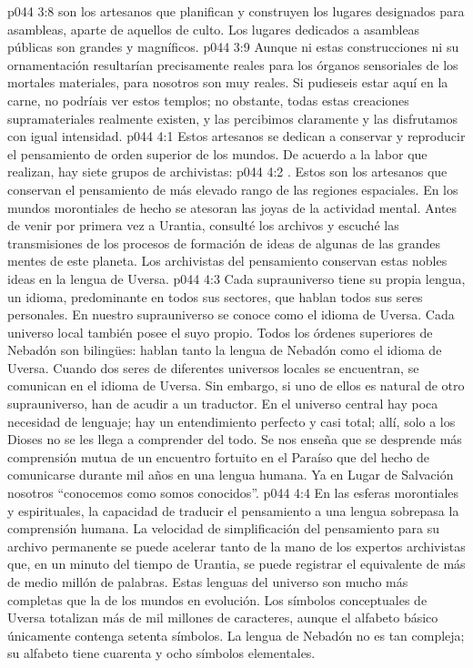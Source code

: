 \vs p044 3:8  son los artesanos que planifican y construyen los lugares designados para asambleas, aparte de aquellos de culto. Los lugares dedicados a asambleas públicas son grandes y magníficos.
\vs p044 3:9 Aunque ni estas construcciones ni su ornamentación resultarían precisamente reales para los órganos sensoriales de los mortales materiales, para nosotros son muy reales. Si pudieseis estar aquí en la carne, no podríais ver estos templos; no obstante, todas estas creaciones supramateriales realmente existen, y las percibimos claramente y las disfrutamos con igual intensidad.
\vs p044 4:1 Estos artesanos se dedican a conservar y reproducir el pensamiento de orden superior de los mundos. De acuerdo a la labor que realizan, hay siete grupos de archivistas:
\vs p044 4:2 . Estos son los artesanos que conservan el pensamiento de más elevado rango de las regiones espaciales. En los mundos morontiales de hecho se atesoran las joyas de la actividad mental. Antes de venir por primera vez a Urantia, consulté los archivos y escuché las transmisiones de los procesos de formación de ideas de algunas de las grandes mentes de este planeta. Los archivistas del pensamiento conservan estas nobles ideas en la lengua de Uversa.
\vs p044 4:3 Cada suprauniverso tiene su propia lengua, un idioma, predominante en todos sus sectores, que hablan todos sus seres personales. En nuestro suprauniverso se conoce como el idioma de Uversa. Cada universo local también posee el suyo propio. Todos los órdenes superiores de Nebadón son bilingües: hablan tanto la lengua de Nebadón como el idioma de Uversa. Cuando dos seres de diferentes universos locales se encuentran, se comunican en el idioma de Uversa. Sin embargo, si uno de ellos es natural de otro suprauniverso, han de acudir a un traductor. En el universo central hay poca necesidad de lenguaje; hay un entendimiento perfecto y casi total; allí, solo a los Dioses no se les llega a comprender del todo. Se nos enseña que se desprende más comprensión mutua de un encuentro fortuito en el Paraíso que del hecho de comunicarse durante mil años en una lengua humana. Ya en Lugar de Salvación nosotros “conocemos como somos conocidos”.
\vs p044 4:4 En las esferas morontiales y espirituales, la capacidad de traducir el pensamiento a una lengua sobrepasa la comprensión humana. La velocidad de simplificación del pensamiento para su archivo permanente se puede acelerar tanto de la mano de los expertos archivistas que, en un minuto del tiempo de Urantia, se puede registrar el equivalente de más de medio millón de palabras. Estas lenguas del universo son mucho más completas que la de los mundos en evolución. Los símbolos conceptuales de Uversa totalizan más de mil millones de caracteres, aunque el alfabeto básico únicamente contenga setenta símbolos. La lengua de Nebadón no es tan compleja; su alfabeto tiene cuarenta y ocho símbolos elementales.
